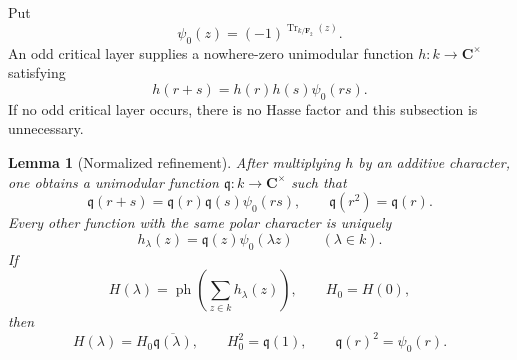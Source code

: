 \documentclass[11pt]{amsart}
\newtheorem{lemma}[theorem]{Lemma}
\theoremstyle{definition}
\theoremstyle{remark}
\newcommand{\C}{\mathbf C}
\newcommand{\F}{\mathbf F}
\newcommand{\Tr}{\operatorname{Tr}}
\newcommand{\ph}{\operatorname{ph}}
\begin{document}
Put
\[
 \psi_0(z)=(-1)^{\Tr_{k/\F_2}(z)}.
\]
An odd critical layer supplies a nowhere-zero unimodular function
$h:k\to\C^\times$ satisfying
\begin{equation}\label{eq:h-law}
 h(r+s)=h(r)h(s)\psi_0(rs).
\end{equation}
If no odd critical layer occurs, there is no Hasse factor and this
subsection is unnecessary.

\begin{lemma}[Normalized refinement]
\label{lem:normalized-refinement}
After multiplying $h$ by an additive character, one obtains a
unimodular function $\mathfrak q:k\to\C^\times$ such that
\begin{equation}\label{eq:q-refinement}
 \mathfrak q(r+s)=\mathfrak q(r)\mathfrak q(s)\psi_0(rs),
 \qquad
 \mathfrak q(r^2)=\mathfrak q(r).
\end{equation}
Every other function with the same polar character is uniquely
\begin{equation}\label{eq:q-linear-family}
 h_\lambda(z)=\mathfrak q(z)\psi_0(\lambda z)
 \qquad(\lambda\in k).
\end{equation}
If
\[
 H(\lambda)=\ph\!\left(\sum_{z\in k}h_\lambda(z)\right),
 \qquad H_0=H(0),
\]
then
\begin{equation}\label{eq:q-phase-translation}
 H(\lambda)=H_0\overline{\mathfrak q(\lambda)},
 \qquad H_0^2=\mathfrak q(1),
 \qquad \mathfrak q(r)^2=\psi_0(r).
\end{equation}
\end{lemma}
\end{document}
